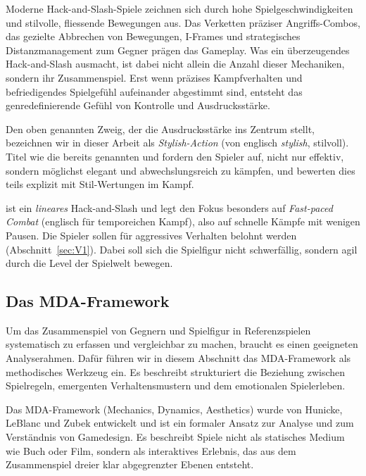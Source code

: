 \documentclass[../Main.tex]{subfiles}
\begin{document}
Moderne Hack-and-Slash-Spiele zeichnen sich durch hohe Spielgeschwindigkeiten und stilvolle, fliessende Bewegungen aus. Das Verketten präziser Angriffs-Combos, das gezielte Abbrechen von Bewegungen, I-Frames und strategisches Distanzmanagement zum Gegner prägen das Gameplay. Was ein überzeugendes Hack-and-Slash ausmacht, ist dabei nicht allein die Anzahl dieser Mechaniken, sondern ihr Zusammenspiel. Erst wenn präzises Kampfverhalten und befriedigendes Spielgefühl aufeinander abgestimmt sind, entsteht das genredefinierende Gefühl von Kontrolle und Ausdrucksstärke.\autocite[5--7]{lindgren2025striking}

Den oben genannten Zweig, der die Ausdrucksstärke ins Zentrum stellt, bezeichnen wir in dieser Arbeit als \textit{Stylish-Action} (von englisch \textit{stylish}, stilvoll). Titel wie die bereits genannten  und  fordern den Spieler auf, nicht nur effektiv, sondern möglichst elegant und abwechslungsreich zu kämpfen, und bewerten dies teils explizit mit Stil-Wertungen im Kampf.\autocite{capcom_devilmaycry_2001,platinumgames_bayonetta_2009}

 ist ein \textit{lineares} Hack-and-Slash und legt den Fokus besonders auf \textit{Fast-paced Combat} (englisch für temporeichen Kampf), also auf schnelle Kämpfe mit wenigen Pausen. Die Spieler sollen für aggressives Verhalten belohnt werden (Abschnitt~\ref{sec:V1}). Dabei soll sich die Spielfigur nicht schwerfällig, sondern agil durch die Level der Spielwelt bewegen.

\subsection{Das MDA-Framework} \label{sec:MDA}
Um das Zusammenspiel von Gegnern und Spielfigur in Referenzspielen systematisch zu erfassen und vergleichbar zu machen, braucht es einen geeigneten Analyserahmen. Dafür führen wir in diesem Abschnitt das MDA-Framework als methodisches Werkzeug ein. Es beschreibt strukturiert die Beziehung zwischen Spielregeln, emergenten Verhaltensmustern und dem emotionalen Spielerleben.\autocite[1--2]{hunicke2004mda}

Das MDA-Framework (Mechanics, Dynamics, Aesthetics) wurde von Hunicke, LeBlanc und Zubek entwickelt und ist ein formaler Ansatz zur Analyse und zum Verständnis von Gamedesign. Es beschreibt Spiele nicht als statisches Medium wie Buch oder Film, sondern als interaktives Erlebnis, das aus dem Zusammenspiel dreier klar abgegrenzter Ebenen entsteht.\autocite[1--2]{hunicke2004mda}
\end{document}
